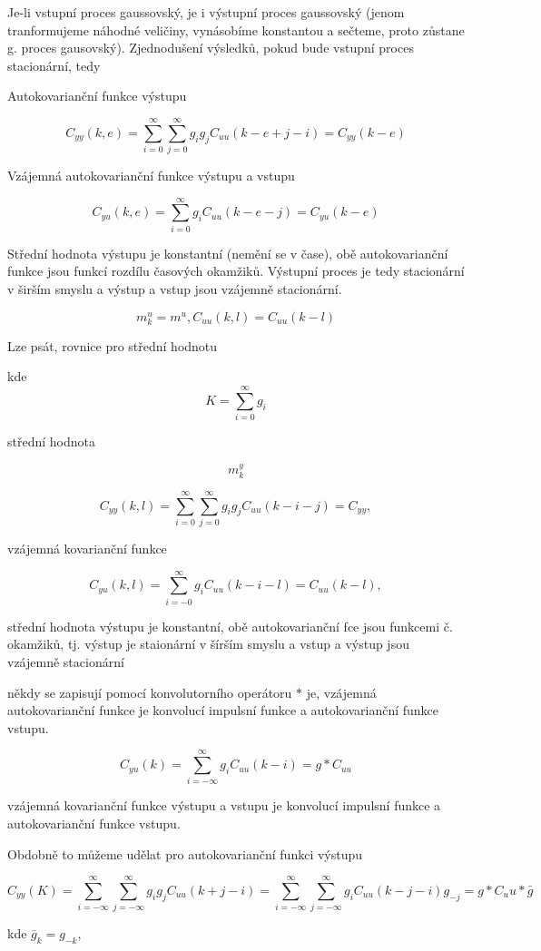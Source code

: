 Je-li vstupní proces gaussovský, je i výstupní proces gaussovský (jenom tranformujeme náhodné veličiny, vynásobíme konstantou a sečteme, proto zůstane g. proces gausovský). Zjednodušení výsledků, pokud bude vstupní proces stacionární, tedy


Autokovarianční funkce výstupu

\[ C_{yy}(k,e) = \sum_{i=0}^\infty \sum_{j=0}^\infty g_i g_j C_{uu}(k-e+j-i)=C_{yy}(k-e) \]

Vzájemná autokovarianční funkce výstupu a vstupu

\[ C_{yu}(k,e) = \sum_{i=0}^\infty g_i C_{uu}(k-e-j)=C_{yu}(k-e) \]

Střední hodnota výstupu je konstantní (nemění se v čase), obě autokovarianční funkce jsou funkcí rozdílu časových okamžiků. Výstupní proces je tedy stacionární v širším smyslu a výstup a vstup jsou vzájemně stacionární.

\[ m_k^u = m^u, C_{uu}(k,l)=C_{uu}(k-l) \]

 Lze psát, rovnice pro střední hodnotu

kde
\[ K=\sum_{i=0}^\infty g_i \]

střední hodnota

\[ m_k^y\]


\[ C_{yy}(k,l) = \sum_{i=0}^\infty \sum_{j=0}^\infty g_i g_j C_{uu}(k-i-j)= C_{yy}, \]

vzájemná kovarianční funkce

\[ C_{yu}(k,l) = \sum_{i=-0}^\infty g_i C_{uu}(k-i-l)=C_{uu}(k-l), \]


střední hodnota výstupu je konstantní, obě autokovarianční fce jsou funkcemi č. okamžiků, tj. výstup je staionární v šírším smyslu a vstup a výstup jsou vzájemně stacionární



někdy se zapisují pomocí konvolutorního operátoru $*$ je, vzájemná autokovarianční funkce je konvolucí impulsní funkce a autokovarianční funkce vstupu.

\[ C_{yu} (k)  =\sum_{i=-\infty}^\infty g_i C_{uu} (k-i) = g * C_{uu} \]

vzájemná kovarianční funkce výstupu a vstupu je konvolucí impulsní funkce a autokovarianční funkce vstupu.

Obdobně to můžeme udělat pro autokovarianční funkci výstupu

\[ C_{yy} (K) = \sum_{i=-\infty}^\infty \sum_{j=-\infty}^\infty g_i g_j C_{uu} (k+j-i) = \sum_{i=-\infty}^\infty \sum_{j=-\infty}^\infty g_i C_{uu}(k-j-i) g_{-j} = g * C_uu * \bar{g}   \]

kde $\bar{g}_k=g_{-k}$,


